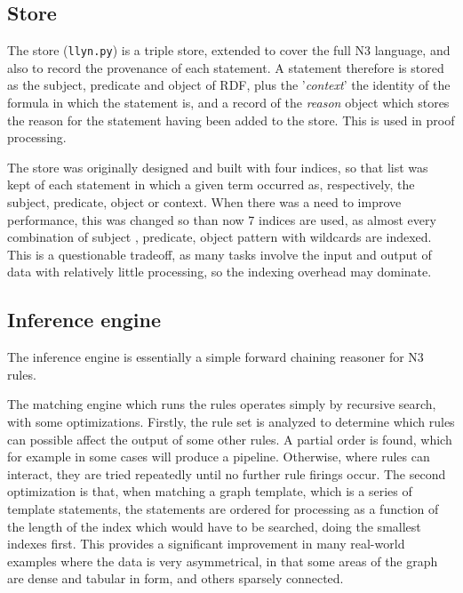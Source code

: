 \documentclass{tlp}
\begin{document}
\subsection{Store}
  

\par The store ({\tt llyn.py}) is a triple store, extended to
cover the full N3 language, and also to record the provenance of
each statement. A statement therefore is stored as the subject,
predicate and object of RDF, plus the '{\em context}' the
identity of the formula in which the statement is, and a record of
the {\em reason} object which stores the reason for the
statement having been added to the store. This is used in proof
processing.

\par The store was originally designed and built with four indices,
so that list was kept of each statement in which a given term
occurred as, respectively, the subject, predicate, object or
context. When there was a need to improve performance, this was
changed so than now 7 indices are used, as almost every combination
of subject , predicate, object pattern with wildcards are indexed.
This is a questionable tradeoff, as many tasks involve the input
and output of data with relatively little processing, so the
indexing overhead may dominate.
\subsection{Inference engine}
  

\par The inference engine is essentially a simple forward chaining
reasoner for N3 rules.

\par The matching engine which runs the rules operates simply by
recursive search, with some optimizations. Firstly, the rule set is
analyzed to determine which rules can possible affect the output of
some other rules. A partial order is found, which for example in
some cases will produce a pipeline. Otherwise, where rules can
interact, they are tried repeatedly until no further rule firings
occur. The second optimization is that, when matching a graph
template, which is a series of template statements, the statements
are ordered for processing as a function of the length of the index
which would have to be searched, doing the smallest indexes first.
This provides a significant improvement in many real-world examples
where the data is very asymmetrical, in that some areas of the
graph are dense and tabular in form, and others sparsely
connected.
\end{document}
